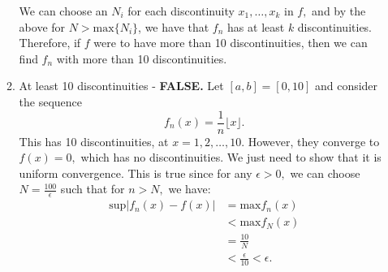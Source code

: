 \documentclass{article}
\numberwithin{equation}{section}
\begin{document}
\begin{enumerate}
\begin{enumerate}[label=(\alph*)]
        We can choose an $N_i$ for each discontinuity $x_1,\dots,x_k$ in $f,$ and by the above for $N> \text{max}\{N_i\}$, we have that $f_n$ has at least $k$ discontinuities. Therefore, if $f$ were to have more than 10 discontinuities, then we can find $f_n$ with more than 10 discontinuities.
        \item At least 10 discontinuities - \textbf{FALSE.} Let $[a,b]=[0,10]$ and consider the sequence 
        \begin{equation}
            f_n(x) = \frac{1}{n}\lfloor x\rfloor.
        \end{equation} 
        This has 10 discontinuities, at $x=1,2,\ldots,10.$ However, they converge to $f(x) = 0,$ which has no discontinuities. We just need to show that it is uniform convergence. This is true since for any $\epsilon > 0,$ we can choose $N = \frac{100}{\epsilon}$ such that for $n>N,$ we have:
        \begin{align}
            \text{sup}|f_n(x) - f(x)| &= \text{max}f_n(x) \\ 
            &< \text{max}f_N(x) \\ 
            &= \frac{10}{N} \\ 
            &< \frac{\epsilon}{10} < \epsilon.
        \end{align}

\end{enumerate}
\end{enumerate}
\end{document}
